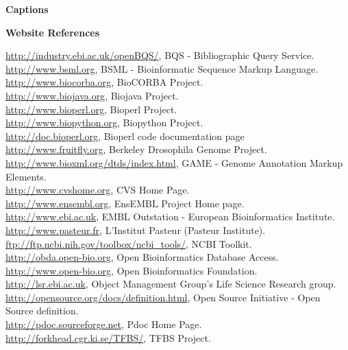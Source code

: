 \documentclass[12pt]{article}
\begin{document}

 

\newpage

\begin{center}{\large \textbf{Captions}}\end{center}

\begin{center}{\large \textbf{Website References}}\end{center}
\par \noindent
\url{http://industry.ebi.ac.uk/openBQS/}, BQS - Bibliographic Query Service.\\
\url{http://www.bsml.org}, BSML - Bioinformatic Sequence Markup Language. \\
\url{http://www.biocorba.org}, BioCORBA Project. \\
\url{http://www.biojava.org}, Biojava Project. \\
\url{http://www.bioperl.org}, Bioperl Project. \\
\url{http://www.biopython.org}, Biopython Project. \\
\url{http://doc.bioperl.org}, Bioperl code documentation page \\
\url{http://www.fruitfly.org}, Berkeley Drosophila Genome Project.\\
\url{http://www.bioxml.org/dtds/index.html},  GAME - Genome
Annotation Markup Elements. \\ 
\url{http://www.cvshome.org}, CVS Home Page. \\
\url{http://www.ensembl.org}, EnsEMBL Project Home page. \\
\url{http://www.ebi.ac.uk}, EMBL Outstation - European Bioinformatics
Institute. \\ 
\url{http://www.pasteur.fr}, L'Institut Pasteur (Pasteur Institute). \\
\url{ftp://ftp.ncbi.nih.gov/toolbox/ncbi_tools/}, NCBI Toolkit. \\
\url{http://obda.open-bio.org}, Open Bioinformatics Database Access. \\
\url{http://www.open-bio.org}, Open Bioinformatics Foundation. \\
\url{http://lsr.ebi.ac.uk}, Object Management Group's Life Science Research group. \\
\url{http://opensource.org/docs/definition.html}, Open Source
Initiative - Open Source definition. \\
\url{http://pdoc.sourceforge.net}, Pdoc Home Page. \\
\url{http://forkhead.cgr.ki.se/TFBS/}, TFBS Project. \\
\end{document}
